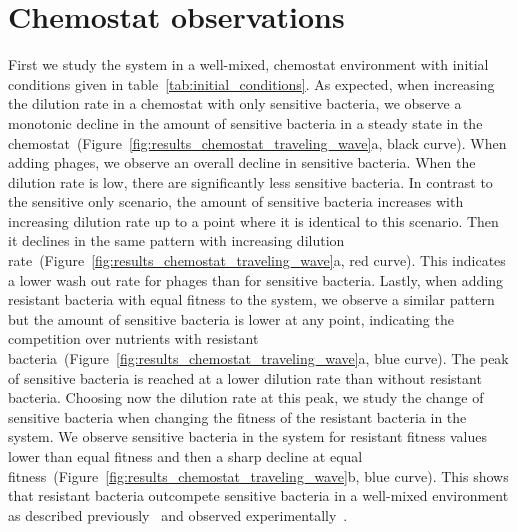 \section{Chemostat observations}
First we study the system in a well-mixed, chemostat environment with initial conditions given in table~\ref{tab:initial_conditions}. As expected, when increasing the dilution rate in a chemostat with only sensitive bacteria, we observe a monotonic decline in the amount of sensitive bacteria in a steady state in the chemostat~(Figure~\ref{fig:results_chemostat_traveling_wave}a, black curve). When adding phages, we observe an overall decline in sensitive bacteria. When the dilution rate is low, there are significantly less sensitive bacteria. In contrast to the sensitive only scenario, the amount of sensitive bacteria increases with increasing dilution rate up to a point where it is identical to this scenario. Then it declines in the same pattern with increasing dilution rate~(Figure~\ref{fig:results_chemostat_traveling_wave}a, red curve). This indicates a lower wash out rate for phages than for sensitive bacteria. Lastly, when adding resistant bacteria with equal fitness to the system, we observe a similar pattern but the amount of sensitive bacteria is lower at any point, indicating the competition over nutrients with resistant bacteria~(Figure~\ref{fig:results_chemostat_traveling_wave}a, blue curve). The peak of sensitive bacteria is reached at a lower dilution rate than without resistant bacteria. Choosing now the dilution rate at this peak, we study the change of sensitive bacteria when changing the fitness of the resistant bacteria in the system. We observe sensitive bacteria in the system for resistant fitness values lower than equal fitness and then a sharp decline at equal fitness~(Figure~\ref{fig:results_chemostat_traveling_wave}b, blue curve). This shows that resistant bacteria outcompete sensitive bacteria in a well-mixed environment as described previously~\cite{Levin1977-lz, Han2012-jp} and observed experimentally~\cite{Lenski1985-wb, Levin1977-lz, Spus2023-jv}.
